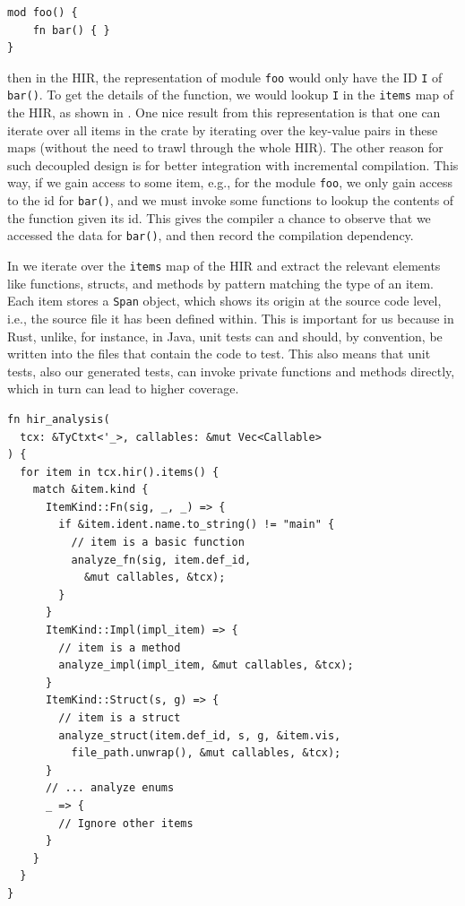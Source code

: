 \documentclass[paper=a4,%
  twoside,%
  BCOR4mm,%
  abstract=true,%
  toc=bibliography,%
  chapterprefix=true,%
  toc=bibliographynumbered,%
  open=right,%
  english,%
  pagesize=pdftex]{scrreprt}
\newcommand{\hir}{\ac{HIR}\xspace}
\begin{document}
\begin{lstlisting}[style=boxed, caption={}]
mod foo() {
    fn bar() { }
}
\end{lstlisting}
then in the \hir, the representation of module \texttt{foo} would only have the ID \texttt{I} of \texttt{bar()}. To get the details of the function, we would lookup \texttt{I} in the \texttt{items} map of the \hir, as shown in . One nice result from this representation is that one can iterate over all items in the crate by iterating over the key-value pairs in these maps (without the need to trawl through the whole \hir). The other reason for such decoupled design is for better integration with incremental compilation. This way, if we gain access to some item, e.g., for the module \texttt{foo}, we only gain access to the id for \texttt{bar()}, and we must invoke some functions to lookup the contents of the function given its id. This gives the compiler a chance to observe that we accessed the data for \texttt{bar()}, and then record the compilation dependency.

In  we iterate over the \texttt{items} map of the \hir and extract the relevant elements like functions, structs, and methods by pattern matching the type of an item. Each item stores a \texttt{Span} object, which shows its origin at the source code level, i.e., the source file it has been defined within. This is important for us because in Rust, unlike, for instance, in Java, unit tests can and should, by convention, be written into the files that contain the code to test. This also means that unit tests, also our generated tests, can invoke private functions and methods directly, which in turn can lead to higher coverage.

\begin{lstlisting}[style=boxed, caption={Iterate over the items in the HIR of a crate}, label=lst:hir-analysis]
fn hir_analysis(
  tcx: &TyCtxt<'_>, callables: &mut Vec<Callable>
) {
  for item in tcx.hir().items() {
    match &item.kind {
      ItemKind::Fn(sig, _, _) => {
        if &item.ident.name.to_string() != "main" {
          // item is a basic function
          analyze_fn(sig, item.def_id,
            &mut callables, &tcx);
        }
      }
      ItemKind::Impl(impl_item) => {
        // item is a method
        analyze_impl(impl_item, &mut callables, &tcx);
      }
      ItemKind::Struct(s, g) => {
        // item is a struct
        analyze_struct(item.def_id, s, g, &item.vis,
          file_path.unwrap(), &mut callables, &tcx);
      }
      // ... analyze enums
      _ => {
        // Ignore other items
      }
    }
  }
}
\end{lstlisting}
\end{document}
